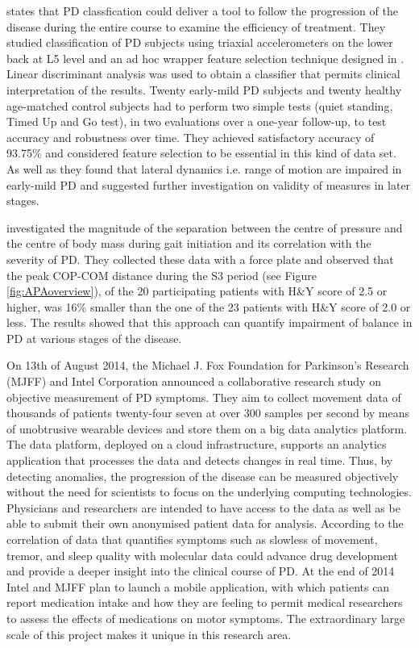 \citeauthor{palmerini_classification_2013} \cite{palmerini_classification_2013} states that PD classfication could deliver a tool to follow the progression of the disease during the entire course to examine the efficiency of treatment. They studied classification of PD subjects  using triaxial accelerometers on the lower back at L5 level and an ad hoc wrapper feature selection technique designed in \cite{palmerini_quantification_2013}. Linear discriminant analysis was used to obtain a classifier that permits clinical interpretation of the results. Twenty early-mild PD subjects and twenty healthy age-matched control subjects had to perform two simple tests (quiet standing, Timed Up and Go test), in two evaluations over a one-year follow-up, to test accuracy and robustness over time. They achieved satisfactory accuracy of 93.75\% and considered feature selection to be essential in this kind of data set. As well as \cite{mancini_anticipatory_2009} they found that lateral dynamics i.e. range of motion are impaired in early-mild PD and suggested further investigation on validity of measures in later stages.

\citeauthor{hass_gait_2005-1} \cite{hass_gait_2005-1} investigated the magnitude of the separation between the centre of pressure and the centre of body mass during gait initiation and its correlation with the severity of PD. They collected these data with a force plate and observed that the peak COP-COM distance during the S3 period (see Figure \ref{fig:APAoverview}), of the 20 participating patients with H\&Y score of 2.5 or higher, was 16\% smaller than the one of the 23 patients with H\&Y score of 2.0 or less. The results showed that this approach can quantify impairment of balance in PD at various stages of the disease.

On 13th of August 2014, the Michael J. Fox Foundation for Parkinson’s Research (MJFF) and Intel Corporation \cite{Intel_2013} announced a collaborative research study on objective measurement of PD symptoms. They aim to collect movement data of thousands of patients twenty-four seven at over 300 samples per second by means of unobtrusive wearable devices and store them on a big data analytics platform. The data platform, deployed on a cloud infrastructure, supports an analytics application that processes the data and detects changes in real time. Thus, by detecting anomalies, the progression of the disease can be measured objectively without the need for scientists to focus on the underlying computing technologies. Physicians and researchers are intended to have access to the data as well as be able to submit their own anonymised patient data for analysis. According to \cite{Intel_2013} the correlation of data that quantifies symptoms such as slowless of movement, tremor, and sleep quality with molecular data could advance drug development and provide a deeper insight into the clinical course of PD. At the end of 2014 Intel and MJFF plan to launch a mobile application, with which patients can report medication intake and how they are feeling to permit medical researchers to assess the effects of medications on motor symptoms. The extraordinary large scale of this project makes it unique in this research area.

